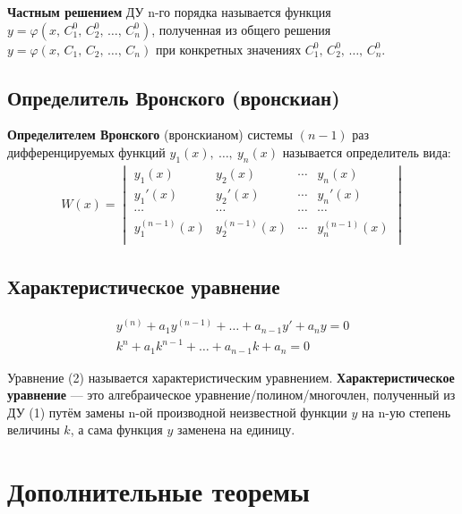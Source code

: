 \begin{definition}
    \textbf{Частным решением} ДУ n-го порядка называется функция\break$y = \varphi(x,\, C_1^0,\, C_2^0,\, \ldots,\, C_n^0)$, полученная из общего решения $y = \varphi(x,\, C_1,\, C_2,\, \ldots,\, C_n)$ при конкретных значениях $C_1^0,\, C_2^0,\, \ldots,\, C_n^0$.
\end{definition}

\subsection{Определитель Вронского (вронскиан)}

\begin{definition}
    \textbf{Определителем Вронского} (вронскианом) системы $(n - 1)$ раз дифференцируемых функций $y_1 (x),\ \ldots,\ y_n(x)$ называется определитель вида:
    \begin{gather*}
        W (x) = \begin{vmatrix}
            y_1(x) & y_2(x) & \cdots & y_n(x) \\
            y_1'(x) & y_2'(x) & \cdots & y_n'(x) \\
            \cdots & \cdots & \cdots & \cdots \\
            y_1^{(n-1)}(x) & y_2^{(n-1)}(x) & \cdots & y_n^{(n-1)}(x) \\
        \end{vmatrix}
    \end{gather*}
\end{definition}

\subsection{Характеристическое уравнение}
\begin{align*}
    y^{(n)} + a_1 y^{(n-1)} + \ldots + a_{n-1} y' + a_n y = 0 \tag{1} \\
    \boxed{k^n + a_1k^{n-1} + \ldots + a_{n-1} k + a_n = 0} \tag{2}
\end{align*}
\begin{definition}
    Уравнение (2) называется характеристическим уравнением. \textbf{Характеристическое уравнение} --- это алгебраическое уравнение/полином/многочлен, полученный из ДУ (1) путём замены n-ой производной неизвестной функции $y$ на n-ую степень величины $k$, а сама функция $y$ заменена на единицу.
\end{definition}

\newpage
\section{Дополнительные теоремы}

